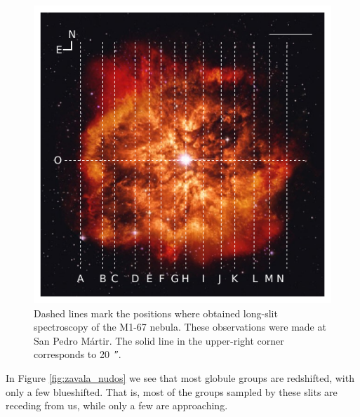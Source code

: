 \documentclass{book}
\begin{document}
\begin{figure}[htb]
    \centering
    \includegraphics[width=\textwidth]{Nuevas imagenes finales/rendijas_zavala.pdf}
    \caption{Dashed lines mark the positions where \cite{Zavala:2022}
      obtained long-slit spectroscopy of the M1-67 nebula. These
      observations were made at San Pedro Mártir. The solid line in
      the upper-right corner corresponds to \SI{20}{\arcsecond}.}
    \label{fig:zavala_rendijas_nebula}
\end{figure}

In Figure \ref{fig:zavala_nudos} we see that most globule groups are
redshifted, with only a few blueshifted. That is, most of the groups
sampled by these slits are receding from us, while only a few are
approaching.
\end{document}
